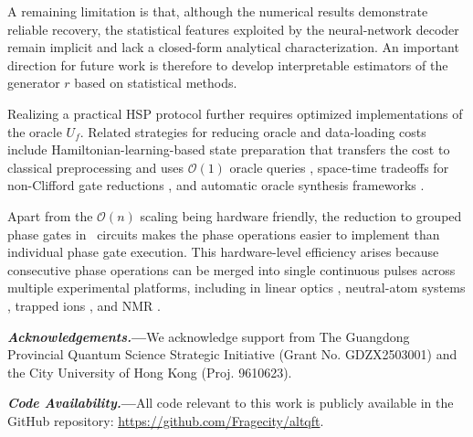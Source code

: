 \documentclass[reprint, aps, prl, superscriptaddress]{revtex4-2}
\newcommand{\rev}[1]{\textcolor{revisioncolor}{#1}}
\renewcommand{\section}[1]{\par\medskip\noindent\textbf{{\textit{#1.}---}}}
\newcommand{\myqc}{\text{HP}}
\begin{document}
 
\rev{A remaining limitation is that, although the numerical results demonstrate reliable recovery, the statistical features exploited by the neural-network decoder remain implicit and lack a closed-form analytical characterization. An important direction for future work is therefore to develop interpretable estimators of the generator $r$ based on statistical methods. }



Realizing a practical HSP protocol further requires optimized implementations of the oracle $U_f$.
Related strategies for reducing oracle and data-loading costs include Hamiltonian-learning-based state preparation that transfers the cost to classical preprocessing and uses \(\mathcal{O}(1)\) oracle queries \cite{learning_hamiltonian_2025}, space-time tradeoffs for non-Clifford gate reductions \cite{yu2025back}, and automatic oracle synthesis frameworks \cite{aos_qdk_2024}. 

Apart from the $\mathcal{O}(n)$ scaling being hardware friendly, the reduction to grouped phase gates in \myqc~circuits makes the phase operations easier to implement than individual phase gate execution. This hardware-level efficiency arises because consecutive phase operations can be merged into single continuous pulses across multiple experimental platforms, including in linear optics \cite{carolan2015universal, Kok2007}, neutral-atom systems \cite{saffman2010quantum, evered2023high, mohan2025parametrized}, trapped ions \cite{Leibfried2003, Tan2013}, and NMR \cite{vandersypen2004nmr}.

\section{Acknowledgements}We acknowledge support from The Guangdong Provincial Quantum Science Strategic Initiative (Grant No. GDZX2503001) and the City University of Hong Kong (Proj. 9610623).
\section{Code Availability}All code relevant to this work is publicly available in the GitHub repository: \url{https://github.com/Fragecity/altqft}.



\end{document}

